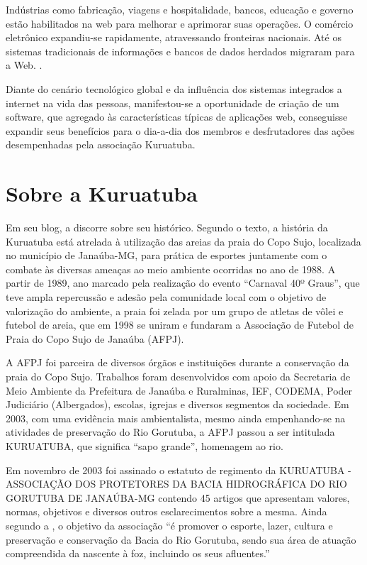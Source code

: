 \begin{citacao}
Indústrias como fabricação, viagens e hospitalidade, bancos, educação e governo estão habilitados na web para melhorar e aprimorar suas operações. O comércio eletrônico expandiu-se rapidamente, atravessando fronteiras nacionais. Até os sistemas tradicionais de informações e bancos de dados herdados migraram para a Web. \cite[p. 1]{ginige2001web}.
\end{citacao}

Diante do cenário tecnológico global e da influência dos sistemas integrados a internet na vida das pessoas, manifestou-se a oportunidade de criação de um software, que agregado às características típicas de aplicações web, conseguisse expandir seus benefícios para o dia-a-dia dos membros e desfrutadores das ações desempenhadas pela associação Kuruatuba.

\hspace{2.5cm}
\section{Sobre a Kuruatuba}
\hspace{2.5cm}

Em seu blog, a  discorre sobre seu histórico. Segundo o texto, a história da Kuruatuba está atrelada à utilização das areias da praia do Copo Sujo, localizada no município de Janaúba-MG, para prática de esportes juntamente com o combate às diversas ameaças ao meio ambiente ocorridas no ano de 1988. A partir de 1989, ano marcado pela realização do evento ``Carnaval 40º Graus'', que teve ampla repercussão e adesão pela comunidade local com o objetivo de valorização do ambiente, a praia foi zelada por um grupo de atletas de vôlei e futebol de areia, que em 1998 se uniram e fundaram a Associação de Futebol de Praia do Copo Sujo de Janaúba (AFPJ).

A AFPJ foi parceira de diversos órgãos e instituições durante a conservação da praia do Copo Sujo. Trabalhos foram desenvolvidos com apoio da Secretaria de Meio Ambiente da Prefeitura de Janaúba e Ruralminas, IEF, CODEMA, Poder Judiciário (Albergados), escolas, igrejas e diversos segmentos da sociedade. Em 2003, com uma evidência mais ambientalista, mesmo ainda empenhando-se na atividades de preservação do Rio Gorutuba, a AFPJ passou a ser intitulada KURUATUBA, que significa ``sapo grande'', homenagem ao rio.  

Em novembro de 2003 foi assinado o estatuto de regimento da KURUATUBA - ASSOCIAÇÃO DOS PROTETORES DA BACIA HIDROGRÁFICA DO RIO GORUTUBA DE JANAÚBA-MG contendo 45 artigos que apresentam valores, normas, objetivos e diversos outros esclarecimentos sobre a mesma. Ainda segundo a \cite{Kuruatuba2011}, o objetivo da associação ``é promover o esporte, lazer, cultura e preservação e conservação da Bacia do Rio Gorutuba, sendo sua área de atuação compreendida da nascente à foz, incluindo os seus afluentes.''

